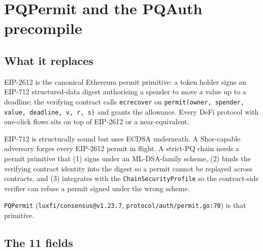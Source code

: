 \section{PQPermit and the PQAuth precompile}
\label{sec:pq-permit}

\subsection{What it replaces}

EIP-2612 \cite{eip2612} is the canonical Ethereum permit primitive: a token
holder signs an EIP-712 structured-data digest authorising a spender to move a
value up to a deadline; the verifying contract calls
\texttt{ecrecover} on \texttt{permit(owner, spender, value, deadline,
v, r, s)} and grants the allowance. Every DeFi protocol with one-click flows
sits on top of EIP-2612 or a near-equivalent.

EIP-712 \cite{eip712} is structurally sound but uses ECDSA underneath. A
Shor-capable adversary forges every EIP-2612 permit in flight. A strict-PQ
chain needs a permit primitive that (1) signs under an ML-DSA-family scheme,
(2) binds the verifying contract identity into the digest so a permit cannot
be replayed across contracts, and (3) integrates with the
\texttt{ChainSecurityProfile} so the contract-side verifier can refuse a
permit signed under the wrong scheme.

\texttt{PQPermit} (\texttt{luxfi/consensus@v1.23.7},
\texttt{protocol/auth/permit.go:70}) is that primitive.

\subsection{The 11 fields}

